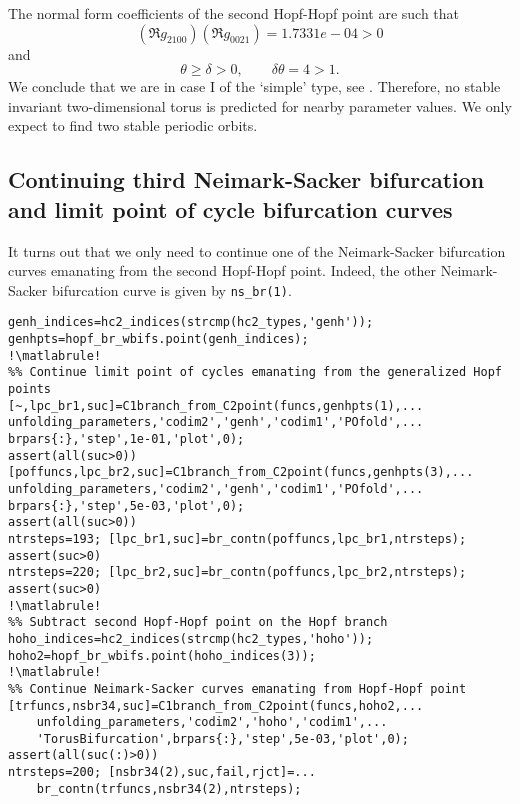 The normal form coefficients of the second Hopf-Hopf point are such that
\[
( \Re g_{2100} )( \Re g_{0021} ) = 1.7331e - 04 > 0
\]
and
\[
\theta\geq \delta > 0, \qquad \delta\theta=4>1.
\]
We conclude that we are in case I of the `simple' type, see \cite[page 360]{Kuznetsov2008}. Therefore, no stable invariant two-dimensional torus is predicted for nearby parameter values. We only expect to find two stable periodic orbits.

\subsection{Continuing third Neimark-Sacker bifurcation and limit point of cycle bifurcation curves}
It turns out that we only need to continue one of the Neimark-Sacker bifurcation curves emanating from the second
Hopf-Hopf point. Indeed, the other Neimark-Sacker bifurcation curve is given
by \lstinline|ns_br(1)|.
\begin{lstlisting}[style=customMatlab,escapechar=!]
%% Subtract generalized Hopf points
genh_indices=hc2_indices(strcmp(hc2_types,'genh'));
genhpts=hopf_br_wbifs.point(genh_indices);
!\matlabrule!
%% Continue limit point of cycles emanating from the generalized Hopf points
[~,lpc_br1,suc]=C1branch_from_C2point(funcs,genhpts(1),...
unfolding_parameters,'codim2','genh','codim1','POfold',...
brpars{:},'step',1e-01,'plot',0);
assert(all(suc>0))
[poffuncs,lpc_br2,suc]=C1branch_from_C2point(funcs,genhpts(3),...
unfolding_parameters,'codim2','genh','codim1','POfold',...
brpars{:},'step',5e-03,'plot',0);
assert(all(suc>0))
ntrsteps=193; [lpc_br1,suc]=br_contn(poffuncs,lpc_br1,ntrsteps);
assert(suc>0)
ntrsteps=220; [lpc_br2,suc]=br_contn(poffuncs,lpc_br2,ntrsteps);
assert(suc>0)
!\matlabrule!
%% Subtract second Hopf-Hopf point on the Hopf branch
hoho_indices=hc2_indices(strcmp(hc2_types,'hoho'));
hoho2=hopf_br_wbifs.point(hoho_indices(3));
!\matlabrule!
%% Continue Neimark-Sacker curves emanating from Hopf-Hopf point
[trfuncs,nsbr34,suc]=C1branch_from_C2point(funcs,hoho2,...
    unfolding_parameters,'codim2','hoho','codim1',...
    'TorusBifurcation',brpars{:},'step',5e-03,'plot',0);
assert(all(suc(:)>0))
ntrsteps=200; [nsbr34(2),suc,fail,rjct]=...
    br_contn(trfuncs,nsbr34(2),ntrsteps);
\end{lstlisting}

